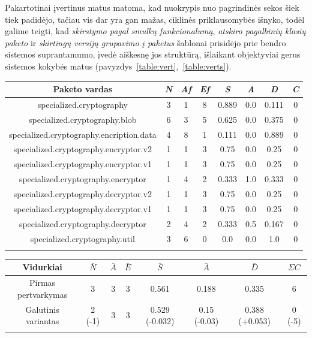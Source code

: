 Pakartotinai įvertinus matus matoma, kad nuokrypis nuo pagrindinės sekos šiek tiek padidėjo, tačiau
vis dar yra gan mažas, ciklinės priklausomybės išnyko, todėl galime teigti, kad \textit{skirstymo pagal smulkų funkcionalumą},
\textit{atskiro pagalbinių klasių paketo} ir \textit{skirtingų versijų grupavimo į paketus} šablonai prisidėjo prie bendro
sistemos suprantamumo, įvedė aiškesnę jos struktūrą, išlaikant objektyviai gerus sistemos kokybės matus (pavyzdys~\ref{table:vert},~\ref{table:verts}).
\begin{center}
    \begin{tabular}{|c|c|c|c|c|c|c|c|}
        \hline
        Paketo vardas & \textit{N} & \textit{Af} & \textit{Ef} & \textit{S} & \textit{A} & \textit{D} & \textit{C} \\ [0.5ex]
        \hline\hline
        specialized.cryptography & 3 & 1 & 8 & 0.889 & 0.0 & 0.111 & 0 \\
        \hline
        specialized.cryptography.blob & 6 & 3 & 5 & 0.625 & 0.0 & 0.375 & 0 \\
        \hline
        specialized.cryptography.encription.data & 4 & 8 & 1 & 0.111 & 0.0 & 0.889 & 0 \\
        \hline
        specialized.cryptography.encryptor.v2 & 1 & 1 & 3 & 0.75 & 0.0 & 0.25 & 0 \\
        \hline
        specialized.cryptography.encryptor.v1 & 1 & 1 & 3 & 0.75 & 0.0 & 0.25 & 0 \\
        \hline
        specialized.cryptography.encryptor & 1 & 4 & 2 & 0.333 & 1.0 & 0.333 & 0 \\
        \hline
        specialized.cryptography.decryptor.v2 & 1 & 1 & 3 & 0.75 & 0.0 & 0.25 & 0 \\
        \hline
        specialized.cryptography.decryptor.v1 & 1 & 1 & 3 & 0.75 & 0.0 & 0.25 & 0 \\
        \hline
        specialized.cryptography.decryptor & 2 & 4 & 2 & 0.333 & 0.5 & 0.167 & 0 \\
        \hline
        specialized.cryptography.util & 3 & 6 & 0 & 0.0 & 0.0 & 1.0 & 0 \\
        \hline
    \label{table:vert}
    \end{tabular}
    \begin{tabular}{|c|c|c|c|c|c|c|c|}
        \hline
        Vidurkiai & $\bar{N}$ & $\bar{A}$ & $\bar{E}$ & $\bar{S}$ & $\bar{A}$ & $\bar{D}$ & $\Sigma C$ \\ [0.5ex]
        \hline\hline
        Pirmas pertvarkymas & 3 & 3 & 3 & 0.561 & 0.188 & 0.335 & 6 \\
        Galutinis variantas & \cellcolor{green!25} 2 (-1) & 3 & 3 & \cellcolor{green!25} 0.529 (-0.032) & \cellcolor{red!25} 0.15 (-0.03) & \cellcolor{red!25} 0.388 (+0.053) &  \cellcolor{green!25} 0 (-5) \\
        \hline
        \label{table:verts}
    \end{tabular}
\end{center}
